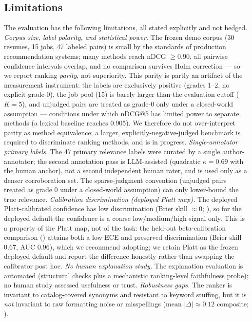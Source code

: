 \subsection{Limitations}\label{sec:6.2}
The evaluation has the following limitations, all stated explicitly and not hedged.
\emph{Corpus size, label polarity, and statistical power.} The frozen demo corpus (30 resumes, 15 jobs, 47 labeled pairs) is small by the standards of production recommendation systems; many methods reach nDCG $\geq 0.90$, all pairwise confidence intervals overlap, and no comparison survives Holm correction --- so we report ranking \emph{parity}, not superiority. This parity is partly an artifact of the measurement instrument: the labels are exclusively positive (grades 1--2, no explicit grade-0), the job pool (15) is barely larger than the evaluation cutoff ($K=5$), and unjudged pairs are treated as grade-0 only under a closed-world assumption --- conditions under which nDCG@5 has limited power to separate methods (a lexical baseline reaches 0.905). We therefore do not over-interpret parity as method equivalence; a larger, explicitly-negative-judged benchmark is required to discriminate ranking methods, and is in progress.
\emph{Single-annotator primary labels.} The 47 primary relevance labels were curated by a single author-annotator; the second annotation pass is LLM-assisted (quadratic $\kappa = 0.69$ with the human anchor), not a second independent human rater, and is used only as a denser corroboration set. The sparse-judgment convention (unjudged pairs treated as grade 0 under a closed-world assumption) can only lower-bound the true relevance.
\emph{Calibration discrimination (deployed Platt map).} The deployed Platt-calibrated confidence has low discrimination (Brier skill $\approx 0$; ), so for the deployed default the confidence is a coarse low/medium/high signal only. This is a property of the Platt map, not of the task: the held-out beta-calibration comparison () attains both a low ECE and preserved discrimination (Brier skill 0.67, AUC 0.96), which we recommend adopting; we retain Platt as the frozen deployed default and report the difference honestly rather than swapping the calibrator post hoc.
\emph{No human explanation study.} The explanation evaluation is automated (structural checks plus a mechanistic ranking-level faithfulness probe); no human study assessed usefulness or trust.
\emph{Robustness gaps.} The ranker is invariant to catalog-covered synonyms and resistant to keyword stuffing, but it is \emph{not} invariant to raw formatting noise or misspellings (mean $|\Delta| \approx 0.12$ composite; ).
